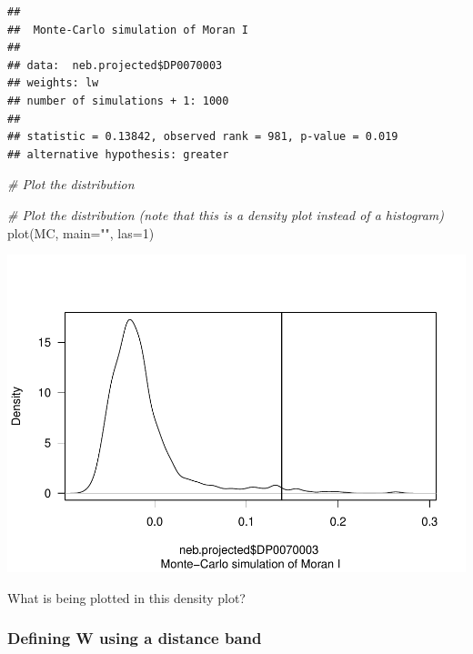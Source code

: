 \documentclass[]{article}
\newenvironment{Shaded}{\begin{snugshade}}{\end{snugshade}}
\newcommand{\AttributeTok}[1]{\textcolor[rgb]{0.77,0.63,0.00}{#1}}
\newcommand{\CommentTok}[1]{\textcolor[rgb]{0.56,0.35,0.01}{\textit{#1}}}
\newcommand{\DecValTok}[1]{\textcolor[rgb]{0.00,0.00,0.81}{#1}}
\newcommand{\FunctionTok}[1]{\textcolor[rgb]{0.00,0.00,0.00}{#1}}
\newcommand{\NormalTok}[1]{#1}
\newcommand{\OtherTok}[1]{\textcolor[rgb]{0.56,0.35,0.01}{#1}}
\newcommand{\SpecialCharTok}[1]{\textcolor[rgb]{0.00,0.00,0.00}{#1}}
\newcommand{\StringTok}[1]{\textcolor[rgb]{0.31,0.60,0.02}{#1}}
\begin{document}
\begin{Shaded}
\end{Shaded}

\begin{verbatim}
## 
##  Monte-Carlo simulation of Moran I
## 
## data:  neb.projected$DP0070003 
## weights: lw  
## number of simulations + 1: 1000 
## 
## statistic = 0.13842, observed rank = 981, p-value = 0.019
## alternative hypothesis: greater
\end{verbatim}

\begin{Shaded}
\begin{Highlighting}[]
\CommentTok{\# Plot the distribution}

\CommentTok{\# Plot the distribution (note that this is a density plot instead of a histogram)}
\FunctionTok{plot}\NormalTok{(MC, }\AttributeTok{main=}\StringTok{""}\NormalTok{, }\AttributeTok{las=}\DecValTok{1}\NormalTok{)}
\end{Highlighting}
\end{Shaded}

\includegraphics{lab03_files/figure-latex/moranmc-1.pdf}

What is being plotted in this density plot?

\hypertarget{defining-w-using-a-distance-band}{%
\subsubsection{\texorpdfstring{Defining \textbf{W} using a distance
band}{Defining W using a distance band}}\label{defining-w-using-a-distance-band}}
\end{document}
